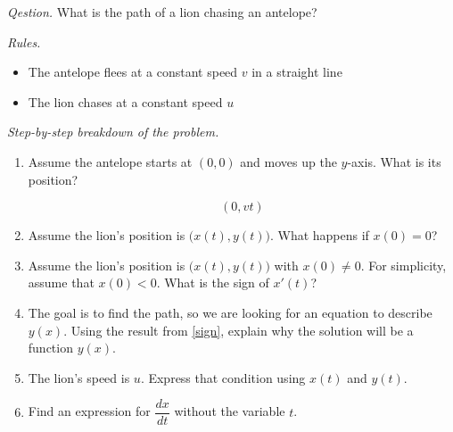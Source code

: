 \emph{Qestion.} 
What is the path of a lion chasing an antelope?

\vfill

\emph{Rules. } 
\begin{itemize}
\item The antelope flees at a constant speed $v$ in a straight line
\item The lion chases at a constant speed $u$
\end{itemize}



\vfill

\emph{Step-by-step breakdown of the problem.}
\begin{enumerate}[label=\emph{\arabic*.}]

\item Assume the antelope starts at $(0,0)$ and moves up the $y$-axis. What is its position?

$$ (0,vt) $$

\item Assume the lion's position is $\big(x(t),y(t)\big)$. What happens if $x(0)=0$?
%    

\item \label{sign} Assume the lion's position is $\big(x(t),y(t)\big)$ with $x(0)\neq 0$. For simplicity, assume that $x(0)<0$. What is the sign of $x'(t)$?


\item \label{func} The goal is to find the path, so we are looking for an equation to describe $y(x)$. Using the result from \ref{sign}, explain why the solution will be a function $y(x)$.


\item \label{speed} The lion's speed is $u$. Express that condition using $x(t)$ and $y(t)$.


\item Find an expression for $\dfrac{dx}{dt}$ without the variable $t$. 
%    
%    


\end{enumerate}
